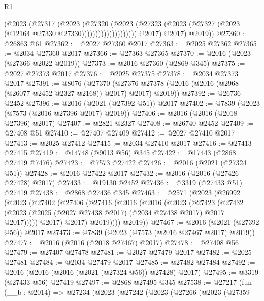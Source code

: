 \begin{lexlean}{R1}
\begin{coremodule}
                                (@2023
                                  (@27317
                                    (@2023
                                      (@27320
                                        (@2023
                                          (@27323
                                            (@2023
                                              (@27327
                                                (@2023 (@12164 @27330 @27330))))))))))))))))))))
            @2017)
          @2017)
        @2019))
@27360 := @26863 @61
@27362 := @2027 @27360 @2017
@27363 := @2025 @27362
@27365 := @2034 @27360 @2017
@27366 := @27363 @27365
@27370 := @2016 (@2023 (@27366 @2022 @2019))
@27373 := @2016 @27360 (@2869 @345)
@27375 := @2027 @27373 @2017
@27376 := @2025 @27375
@27378 := @2034 @27373 @2017
@27391 := @8076
    (@27370 (@27376 @27378 (@2016 (@2016 (@2968 (@26077 @2452 @2327 @2168)) @2017) @2017) @2019))
@27392 := @26736 @2452
@27396 := @2016 (@2021 (@27392 @51)) @2017
@27402 := @7839 (@2023 (@7573 (@2016 @27396 @2017) @2019))
@27406 := @2016 (@2016 (@2018 @27396) @2017)
@27407 := @2821 @2327
@27408 := @26740 @2452
@27409 := @27408 @51
@27410 := @27407 @27409
@27412 := @2027 @27410 @2017
@27413 := @2025 @27412
@27415 := @2034 @27410 @2017
@27416 := @27413 @27415
@27419 := @14748 (@9013 @56) @345
@27422 := @17443 (@2868 @27419 @7476)
@27423 := @7573 @27422
@27426 := @2016 (@2021 (@27324 @51))
@27428 := @2016 @27422 @2017
@27432 := @2016 (@2016 (@27426 @27428) @2017)
@27433 := @19130 @2452
@27436 := @3319 (@27433 @51) @27419
@27438 := @2868 @27436 @345
@27463 := @2571
    (@2023
      (@26992
        (@2023
          (@27402
            (@27406
              (@27416
                (@2016
                  (@2016
                    (@2023
                      (@27423
                        (@27432
                          (@2023 (@2025 (@2027 @27438 @2017) (@2034 @27438 @2017) @2017 @2017)))))
                    @2017)
                  @2017)
                @2019))))
        @2019))
@27467 := @2016 (@2021 (@27392 @56)) @2017
@27473 := @7839 (@2023 (@7573 (@2016 @27467 @2017) @2019))
@27477 := @2016 (@2016 (@2018 @27467) @2017)
@27478 := @27408 @56
@27479 := @27407 @27478
@27481 := @2027 @27479 @2017
@27482 := @2025 @27481
@27484 := @2034 @27479 @2017
@27485 := @27482 @27484
@27492 := @2016 (@2016 (@2016 (@2021 (@27324 @56)) @27428) @2017)
@27495 := @3319 (@27433 @56) @27419
@27497 := @2868 @27495 @345
@27538 := @27217
    (fun (__b : @2014) =>
    @27234
      (@2023
        (@27242
          (@2023
            (@27266
              (@2023
                (@27359

\end{coremodule}
\end{lexlean}
